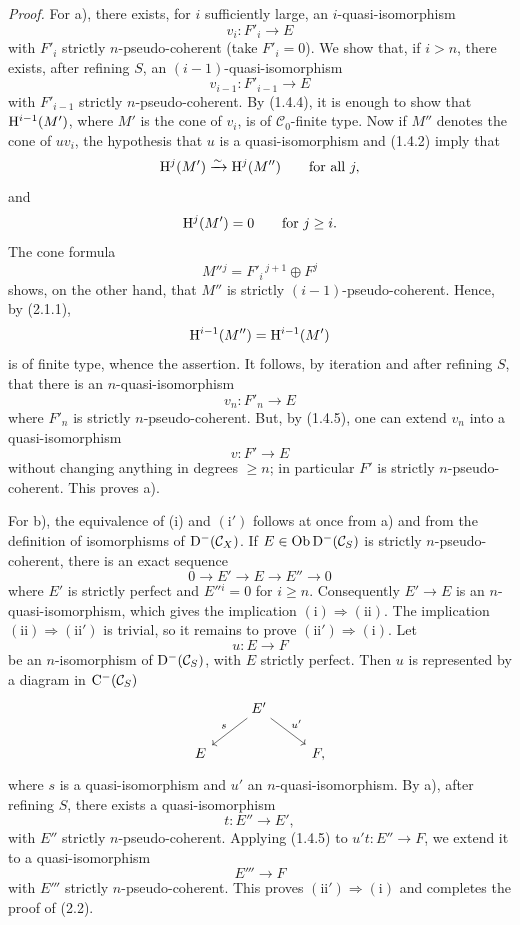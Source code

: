 \documentclass[11pt]{article}
\begin{document}
\emph{Proof.} For a), there exists, for \(i\) sufficiently large, an \(i\)-quasi-isomorphism
\[
  v_i:F'_i\longrightarrow E
\]
with \(F'_i\) strictly \(n\)-pseudo-coherent (take \(F'_i=0\)). We show that, if \(i>n\), there exists, after refining \(S\), an \((i-1)\)-quasi-isomorphism
\[
  v_{i-1}:F'_{i-1}\longrightarrow E
\]
with \(F'_{i-1}\) strictly \(n\)-pseudo-coherent. By (1.4.4), it is enough to show that \(\mathrm H^{i-1}(M')\), where \(M'\) is the cone of \(v_i\), is of \(\mathcal C_0\)-finite type. Now if \(M''\) denotes the cone of \(uv_i\), the hypothesis that \(u\) is a quasi-isomorphism and (1.4.2) imply that
\[
  \mathrm H^j(M')\xrightarrow{\sim} \mathrm H^j(M'')\qquad\text{for all }j,
\]
and
\[
  \mathrm H^j(M')=0\qquad\text{for }j\geq i.
\]
The cone formula
\[
  M''{}^j=F'_i{}^{\,j+1}\oplus F^j
\]
shows, on the other hand, that \(M''\) is strictly \((i-1)\)-pseudo-coherent. Hence, by (2.1.1),
\[
  \mathrm H^{i-1}(M'')=\mathrm H^{i-1}(M')
\]
is of finite type, whence the assertion. It follows, by iteration and after refining \(S\), that there is an \(n\)-quasi-isomorphism
\[
  v_n:F'_n\longrightarrow E
\]
where \(F'_n\) is strictly \(n\)-pseudo-coherent. But, by (1.4.5), one can extend \(v_n\) into a quasi-isomorphism
\[
  v:F'\longrightarrow E
\]
without changing anything in degrees \(\geq n\); in particular \(F'\) is strictly \(n\)-pseudo-coherent. This proves a).

For b), the equivalence of (i) and \((\mathrm{i}')\) follows at once from a) and from the definition of isomorphisms of \(\mathrm D^-(\mathcal C_X)\). If \(E\in\operatorname{Ob}\mathrm D^-(\mathcal C_S)\) is strictly \(n\)-pseudo-coherent, there is an exact sequence
\[
  0\longrightarrow E'\longrightarrow E\longrightarrow E''\longrightarrow 0
\]
where \(E'\) is strictly perfect and \(E''{}^i=0\) for \(i\geq n\). Consequently \(E'\to E\) is an \(n\)-quasi-isomorphism, which gives the implication \((\mathrm{i})\Rightarrow(\mathrm{ii})\). The implication \((\mathrm{ii})\Rightarrow(\mathrm{ii}')\) is trivial, so it remains to prove \((\mathrm{ii}')\Rightarrow(\mathrm{i})\). Let
\[
  u:E\longrightarrow F
\]
be an \(n\)-isomorphism of \(\mathrm D^-(\mathcal C_S)\), with \(E\) strictly perfect. Then \(u\) is represented by a diagram in \(\mathrm C^-(\mathcal C_S)\)
\[
\begin{tikzcd}
& E' \arrow[dl,"s"'] \arrow[dr,"u'"]\\
E && F ,
\end{tikzcd}
\]
where \(s\) is a quasi-isomorphism and \(u'\) an \(n\)-quasi-isomorphism. By a), after refining \(S\), there exists a quasi-isomorphism
\[
  t:E''\longrightarrow E',
\]
with \(E''\) strictly \(n\)-pseudo-coherent. Applying (1.4.5) to \(u't:E''\to F\), we extend it to a quasi-isomorphism
\[
  E'''\longrightarrow F
\]
with \(E'''\) strictly \(n\)-pseudo-coherent. This proves \((\mathrm{ii}')\Rightarrow(\mathrm{i})\) and completes the proof of (2.2).
\end{document}
